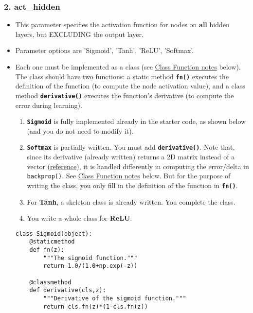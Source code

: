 \documentclass[11pt]{article}
\begin{document}
\subsubsection*{2. act\_hidden}
\label{sec:org913a774}
\begin{itemize}
\item This parameter specifies the activation function for nodes on \textbf{all} hidden layers, but EXCLUDING the output layer.
\item Parameter options are 'Sigmoid', 'Tanh', 'ReLU', 'Softmax'.

\item Each one must be implemented as a class (see \hyperref[sec:org77df2bb]{Class Function notes} below).  The class should have two functions: a static method \textbf{\texttt{fn()}} executes the definition of the function (to compute the node activation value), and a class method \textbf{\texttt{derivative()}} executes the function's derivative (to compute the error during learning).

\begin{enumerate}
\item \textbf{\texttt{Sigmoid}} is fully implemented already in the starter code, as shown below (and you do not need to modify it).
\item \textbf{\texttt{Softmax}} is partially written.  You must add \textbf{\texttt{derivative()}}.  Note that, since its derivative (already written) returns a 2D matrix instead of a vector (\href{https://medium.com/@aerinykim/how-to-implement-the-softmax-derivative-independently-from-any-loss-function-ae6d44363a9d}{reference}), it is handled differently in computing the error/delta in \texttt{backprop()}.  See \hyperref[sec:org77df2bb]{Class Function notes} below.  But for the purpose of writing the class, you only fill in the definition of the function in \textbf{\texttt{fn()}}.
\item For \textbf{Tanh}, a skeleton class is already written.  You complete the class.
\item You write a whole class for \textbf{ReLU}.
\end{enumerate}

\begin{verbatim}
class Sigmoid(object):    
    @staticmethod
    def fn(z):
        """The sigmoid function."""
        return 1.0/(1.0+np.exp(-z))

    @classmethod
    def derivative(cls,z):
        """Derivative of the sigmoid function."""
        return cls.fn(z)*(1-cls.fn(z))


\end{verbatim}
\end{itemize}
\end{document}
